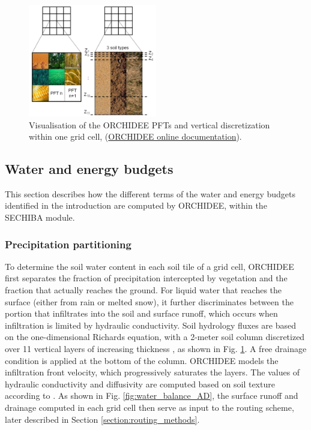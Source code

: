 \begin{figure}[hbtp]
    \centering
    \includegraphics[width=0.5\textwidth]{images/methods/ORC_discretization.png}
    \caption{Visualisation of the ORCHIDEE PFTs and vertical discretization within one grid cell, (\href{https://orchidee.ipsl.fr/introduction/}{ORCHIDEE online documentation}).}
    \label{fig:ORC_discretization}
\end{figure}

\subsection{Water and energy budgets}\label{sec:water}

This section describes how the different terms of the water and energy budgets identified in the introduction are computed by ORCHIDEE, within the SECHIBA module. 

\subsubsection*{Precipitation partitioning}

To determine the soil water content in each soil tile of a grid cell, ORCHIDEE first separates the fraction of precipitation intercepted by vegetation and the fraction that actually reaches the ground. 
For liquid water that reaches the surface (either from rain or melted snow), it further discriminates between the portion that infiltrates into the soil and surface runoff, which occurs when infiltration is limited by hydraulic conductivity. Soil hydrology fluxes are based on the one-dimensional Richards equation, with a 2-meter soil column discretized over 11 vertical layers of increasing thickness \citep{de_rosnay_impact_2002, dorgeval_sensitivity_2008}, as shown in Fig. \ref{fig:ORC_discretization}. A free drainage condition is applied at the bottom of the column. ORCHIDEE models the infiltration front velocity, which progressively saturates the layers. The values of hydraulic conductivity and diffusivity are computed based on soil texture according to \citet{mualem_new_1976, van_genuchten_closed-form_1980}. As shown in Fig. \ref{fig:water_balance_AD}, the surface runoff and drainage computed in each grid cell then serve as input to the routing scheme, later described in Section \ref{section:routing_methods}.

